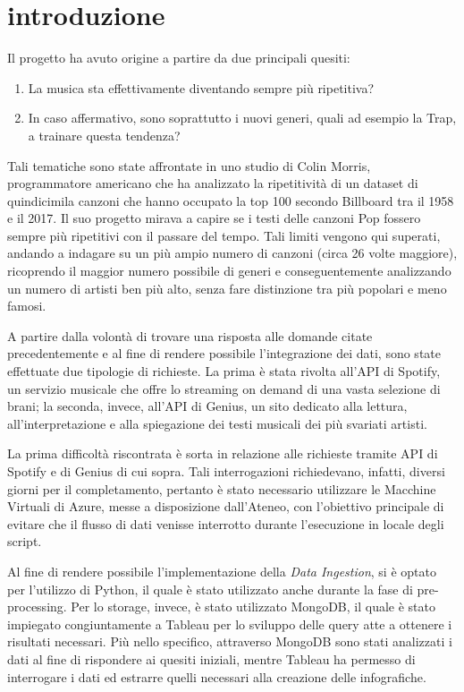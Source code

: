 \documentclass[fleqn,10pt]{SelfArx} %
\begin{document}
\section{introduzione}
{\small
Il progetto ha avuto origine a partire da due principali quesiti:

\begin{enumerate}
\item La musica sta effettivamente diventando sempre più ripetitiva?
\item In caso affermativo, sono soprattutto i nuovi generi, quali ad esempio la Trap, a trainare questa tendenza?
\end{enumerate}

Tali tematiche sono state affrontate in uno studio di Colin Morris, programmatore americano che ha analizzato la ripetitività di un dataset di quindicimila canzoni che hanno occupato la top 100 secondo Billboard tra il 1958 e il 2017. Il suo progetto mirava a capire se i testi delle canzoni Pop fossero sempre più ripetitivi con il passare del tempo. Tali limiti vengono qui superati, andando a indagare su un più ampio numero di canzoni (circa 26 volte maggiore), ricoprendo il maggior numero possibile di generi e conseguentemente analizzando un numero di artisti ben più alto, senza fare distinzione tra più popolari e meno famosi.

A partire dalla volontà di trovare una risposta alle domande citate precedentemente e al fine di rendere possibile l’integrazione dei dati, sono state effettuate due tipologie di richieste. La prima è stata rivolta all’API di Spotify, un servizio musicale che offre lo streaming on demand di una vasta selezione di brani; la seconda, invece, all’API di Genius, un sito dedicato alla lettura, all’interpretazione e alla spiegazione dei testi musicali dei più svariati artisti.

La prima difficoltà riscontrata è sorta in relazione alle richieste tramite API di Spotify e di Genius di cui sopra. Tali interrogazioni richiedevano, infatti, diversi giorni per il completamento, pertanto è stato necessario utilizzare le Macchine Virtuali di Azure, messe a disposizione dall'Ateneo, con l'obiettivo principale di evitare che il flusso di dati venisse interrotto durante l'esecuzione in locale degli script.

Al fine di rendere possibile l’implementazione della \textit{Data Ingestion}, si è optato per l’utilizzo di Python, il quale è stato utilizzato anche durante la fase di pre-processing. Per lo storage, invece, è stato utilizzato MongoDB, il quale è stato impiegato congiuntamente a Tableau per lo sviluppo delle query atte a ottenere i risultati necessari. Più nello specifico, attraverso MongoDB sono stati analizzati i dati al fine di rispondere ai quesiti iniziali,  mentre Tableau ha permesso di interrogare i dati ed estrarre quelli necessari alla creazione delle infografiche.

}
\end{document}

